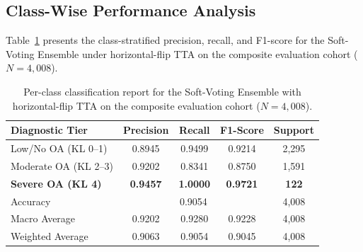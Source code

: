 \documentclass[10pt,journal]{IEEEtran}
\begin{document}
\subsection{Class-Wise Performance Analysis}
\label{subsec:classwise}

Table~\ref{tab:classwise} presents the class-stratified precision, recall, and F1-score for the Soft-Voting Ensemble under horizontal-flip TTA on the composite evaluation cohort ($N = 4{,}008$).

\begin{table}[t]
\centering
\caption{Per-class classification report for the Soft-Voting Ensemble with horizontal-flip TTA on the composite evaluation cohort ($N = 4{,}008$).}
\label{tab:classwise}
\scriptsize
\setlength{\tabcolsep}{5pt}
\renewcommand{\arraystretch}{1.1}
\begin{tabular}{lcccc}
\toprule
\textbf{Diagnostic Tier} & \textbf{Precision} & \textbf{Recall} & \textbf{F1-Score} & \textbf{Support} \\
\midrule
Low/No OA (KL 0--1) & 0.8945 & 0.9499 & 0.9214 & 2{,}295 \\
Moderate OA (KL 2--3) & 0.9202 & 0.8341 & 0.8750 & 1{,}591 \\
\textbf{Severe OA (KL 4)} & \textbf{0.9457} & \textbf{1.0000} & \textbf{0.9721} & \textbf{122} \\
\midrule
Accuracy & \multicolumn{3}{c}{0.9054} & 4{,}008 \\
Macro Average & 0.9202 & 0.9280 & 0.9228 & 4{,}008 \\
Weighted Average & 0.9063 & 0.9054 & 0.9045 & 4{,}008 \\
\bottomrule
\end{tabular}
\end{table}
\end{document}

